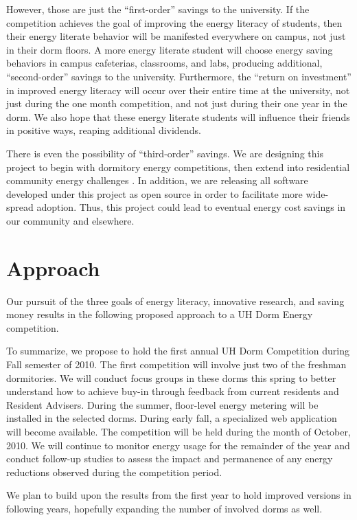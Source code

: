 \documentclass[11pt]{article}
\begin{document}
However, those are just the ``first-order'' savings to the university.  If
the competition achieves the goal of improving the energy literacy of
students, then their energy literate behavior will be manifested everywhere
on campus, not just in their dorm floors.  A more energy literate student
will choose energy saving behaviors in campus cafeterias, classrooms, and
labs, producing additional, ``second-order'' savings to the university.
Furthermore, the ``return on investment'' in improved energy literacy will
occur over their entire time at the university, not just during the one
month competition, and not just during their one year in the dorm.  We also
hope that these energy literate students will influence their friends in
positive ways, reaping additional dividends.

There is even the possibility of ``third-order'' savings.  We are designing
this project to begin with dormitory energy competitions, then extend into
residential community energy challenges \cite{csdl2-09-15}.  In addition,
we are releasing all software developed under this project as open source
in order to facilitate more wide-spread adoption.  Thus, this project could
lead to eventual energy cost savings in our community and elsewhere.

\section{Approach}
\label{sec:approach}

Our pursuit of the three goals of energy literacy, innovative research, and
saving money results in the following proposed approach to a UH Dorm
Energy competition.  

To summarize, we propose to hold the first annual UH Dorm Competition
during Fall semester of 2010.  The first competition will involve just two
of the freshman dormitories. We will conduct focus groups in these dorms this
spring to better understand how to achieve buy-in through feedback from current residents and Resident
Advisers.  During the summer, floor-level energy metering will be installed
in the selected dorms.  During early fall, a specialized web application
will become available. The competition will be held during the month of
October, 2010.  We will continue to monitor energy usage for the remainder
of the year and conduct follow-up studies to assess the impact and
permanence of any energy reductions observed during the competition period.

We plan to build upon the results from the first year to hold improved
versions in following years, hopefully expanding the number of involved
dorms as well. 
\end{document}
